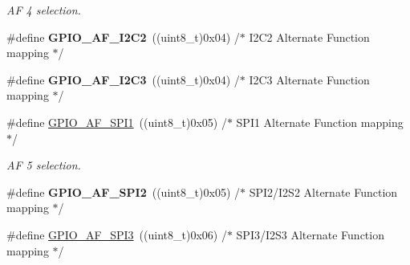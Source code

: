 \begin{DoxyCompactItemize}
\begin{DoxyCompactList}\small\item\em A\-F 4 selection. \end{DoxyCompactList}\item 
\hypertarget{group___g_p_i_o___alternat__function__selection__define_ga4a82500bac7239134e2c28d4656810f1}{\#define {\bfseries G\-P\-I\-O\-\_\-\-A\-F\-\_\-\-I2\-C2}~((uint8\-\_\-t)0x04)  /$\ast$ I2\-C2 Alternate Function mapping $\ast$/}\label{group___g_p_i_o___alternat__function__selection__define_ga4a82500bac7239134e2c28d4656810f1}

\item 
\hypertarget{group___g_p_i_o___alternat__function__selection__define_ga302620e38b718a54d760845de2a06b2b}{\#define {\bfseries G\-P\-I\-O\-\_\-\-A\-F\-\_\-\-I2\-C3}~((uint8\-\_\-t)0x04)  /$\ast$ I2\-C3 Alternate Function mapping $\ast$/}\label{group___g_p_i_o___alternat__function__selection__define_ga302620e38b718a54d760845de2a06b2b}

\item 
\hypertarget{group___g_p_i_o___alternat__function__selection__define_ga7804aaf9275dbb5502312729a76d13be}{\#define \hyperlink{group___g_p_i_o___alternat__function__selection__define_ga7804aaf9275dbb5502312729a76d13be}{G\-P\-I\-O\-\_\-\-A\-F\-\_\-\-S\-P\-I1}~((uint8\-\_\-t)0x05)  /$\ast$ S\-P\-I1 Alternate Function mapping $\ast$/}\label{group___g_p_i_o___alternat__function__selection__define_ga7804aaf9275dbb5502312729a76d13be}

\begin{DoxyCompactList}\small\item\em A\-F 5 selection. \end{DoxyCompactList}\item 
\hypertarget{group___g_p_i_o___alternat__function__selection__define_ga45d0fbf9ba0bf0f554697e78712fc369}{\#define {\bfseries G\-P\-I\-O\-\_\-\-A\-F\-\_\-\-S\-P\-I2}~((uint8\-\_\-t)0x05)  /$\ast$ S\-P\-I2/\-I2\-S2 Alternate Function mapping $\ast$/}\label{group___g_p_i_o___alternat__function__selection__define_ga45d0fbf9ba0bf0f554697e78712fc369}

\item 
\hypertarget{group___g_p_i_o___alternat__function__selection__define_gad6e716ad894aa5299273541c6966864a}{\#define \hyperlink{group___g_p_i_o___alternat__function__selection__define_gad6e716ad894aa5299273541c6966864a}{G\-P\-I\-O\-\_\-\-A\-F\-\_\-\-S\-P\-I3}~((uint8\-\_\-t)0x06)  /$\ast$ S\-P\-I3/\-I2\-S3 Alternate Function mapping $\ast$/}\label{group___g_p_i_o___alternat__function__selection__define_gad6e716ad894aa5299273541c6966864a}


\end{DoxyCompactItemize}
